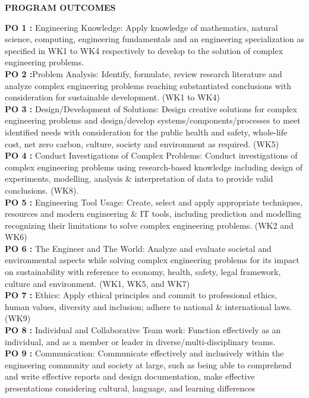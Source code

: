 \begin{center}
\begin{minipage}{0.92\textwidth}
\begin{center}
{\large\bfseries\textcolor{cyan!70!blue}{PROGRAM OUTCOMES}}
\end{center}
\textbf{PO 1 :} Engineering Knowledge: Apply knowledge of mathematics, natural science, computing, engineering fundamentals and an engineering specialization as specified in WK1 to WK4 respectively to develop to the solution of complex engineering problems.\\
\textbf{PO 2 :}Problem Analysis: Identify, formulate, review research literature and analyze complex engineering problems reaching substantiated conclusions with consideration for sustainable development. (WK1 to WK4) \\
\textbf{PO 3 :} Design/Development of Solutions: Design creative solutions for complex engineering problems and design/develop systems/components/processes to meet identified needs with consideration for the public health and safety, whole-life cost, net zero carbon, culture, society and environment as required. (WK5) \\
\textbf{PO 4 :} Conduct Investigations of Complex Problems: Conduct investigations of complex engineering problems using research-based knowledge including design of experiments, modelling, analysis \& interpretation of data to provide valid conclusions. (WK8). \\
\textbf{PO 5 :} Engineering Tool Usage: Create, select and apply appropriate techniques, resources and modern engineering \& IT tools, including prediction and modelling recognizing their limitations to solve complex engineering problems. (WK2 and WK6) \\
\textbf{PO 6 :} The Engineer and The World: Analyze and evaluate societal and environmental aspects while solving complex engineering problems for its impact on sustainability with reference to economy, health, safety, legal framework, culture and environment. (WK1, WK5, and WK7) \\
\textbf{PO 7 :} Ethics: Apply ethical principles and commit to professional ethics, human values, diversity and inclusion; adhere to national \& international laws. (WK9)\\
\textbf{PO 8 :} Individual and Collaborative Team work: Function effectively as an individual, and as a member or leader in diverse/multi-disciplinary teams. \\
\textbf{PO 9 :} Communication: Communicate effectively and inclusively within the engineering community and society at large, such as being able to comprehend and write effective reports and design documentation, make effective presentations considering cultural, language, and learning differences \\

\end{minipage}
\end{center}

